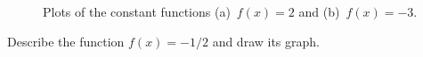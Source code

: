 \documentclass[a4paper,oneside,12pt]{article}
\begin{document}
\begin{figure}[!htbp]
\centering
{}
\qquad
\caption{%
  Plots of the constant functions (a)~$f(x) = 2$ and
  (b)~$f(x) = -3$.
}
\label{fig:constant_functions}
\end{figure}

\begin{exercise}
Describe the function $f(x) = -1/2$ and draw its graph.
\end{exercise}
\end{document}
